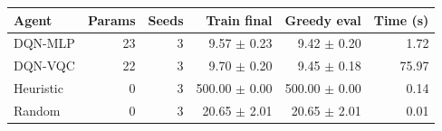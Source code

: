 \begin{tabular}{lrrrrr}
\hline
Agent & Params & Seeds & Train final & Greedy eval & Time (s) \\
\hline
DQN-MLP & 23 & 3 & 9.57 $\pm$ 0.23 & 9.42 $\pm$ 0.20 & 1.72 \\
DQN-VQC & 22 & 3 & 9.70 $\pm$ 0.20 & 9.45 $\pm$ 0.18 & 75.97 \\
Heuristic & 0 & 3 & 500.00 $\pm$ 0.00 & 500.00 $\pm$ 0.00 & 0.14 \\
Random & 0 & 3 & 20.65 $\pm$ 2.01 & 20.65 $\pm$ 2.01 & 0.01 \\
\hline
\end{tabular}
